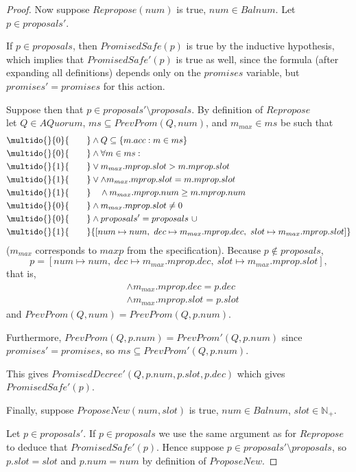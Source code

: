 \documentclass[12pt,a4paper,en]{pracamgr}
\newcommand{\mbb}[1]{\mathbb{#1}}
\newcommand{\ind}[1]{\multido{}{#1}{\qquad}}
\begin{document}
\begin{proof}
    Now suppose $Repropose(num)$ is true, $num \in Balnum$. Let $p \in proposals'$.

    If $p \in proposals$, then $PromisedSafe(p)$ is true by the inductive hypothesis, which implies that $PromisedSafe'(p)$ is true as well, since the formula (after expanding all definitions) depends only on the $promises$ variable, but $promises' = promises$ for this action.

    Suppose then that $p \in proposals' \setminus proposals$. By definition of $Repropose$\\
    let $Q \in AQuorum$, $ms \subseteq PrevProm(Q, num)$, and $m_{max} \in ms$ be such that
    \begin{align*}
        & \ind{0} \land Q \subseteq \{m.acc: m \in ms\}\\
        & \ind{0} \land \forall m \in ms:\\
        & \ind{1} \lor m_{max}.mprop.slot > m.mprop.slot\\
        & \ind{1} \lor \land m_{max}.mprop.slot = m.mprop.slot\\
        & \ind{1} \quad \land m_{max}.mprop.num \ge m.mprop.num\\
        & \ind{0} \land m_{max}.mprop.slot \neq 0\\
        & \ind{0} \land proposals' = proposals\ \cup\\
        & \ind{1} \{[num \mapsto num,\ dec \mapsto m_{max}.mprop.dec,\ slot \mapsto m_{max}.mprop.slot]\}
    \end{align*}
    ($m_{max}$ corresponds to $maxp$ from the specification). Because $p \notin proposals$,
    $$ p = [num \mapsto num,\ dec \mapsto m_{max}.mprop.dec,\ slot \mapsto m_{max}.mprop.slot], $$
    that is,
    \begin{align*}
        & \land m_{max}.mprop.dec = p.dec\\
        & \land m_{max}.mprop.slot = p.slot
    \end{align*}
    and $PrevProm(Q, num) = PrevProm(Q, p.num)$.

    Furthermore, $PrevProm(Q, p.num) = PrevProm'(Q, p.num)$ since $promises' = promises$, so $ms \subseteq PrevProm'(Q, p.num)$.

    This gives $PromisedDecree'(Q, p.num, p.slot, p.dec)$ which gives $PromisedSafe'(p)$.

    Finally, suppose $ProposeNew(num, slot)$ is true, $num \in Balnum$, $slot \in \mbb N_+$.

    Let $p \in proposals'$. If $p \in proposals$ we use the same argument as for $Repropose$ to deduce that $PromisedSafe'(p)$. Hence suppose $p \in proposals' \setminus proposals$, so $p.slot = slot$ and $p.num = num$ by definition of $ProposeNew$.


\end{proof}
\end{document}
